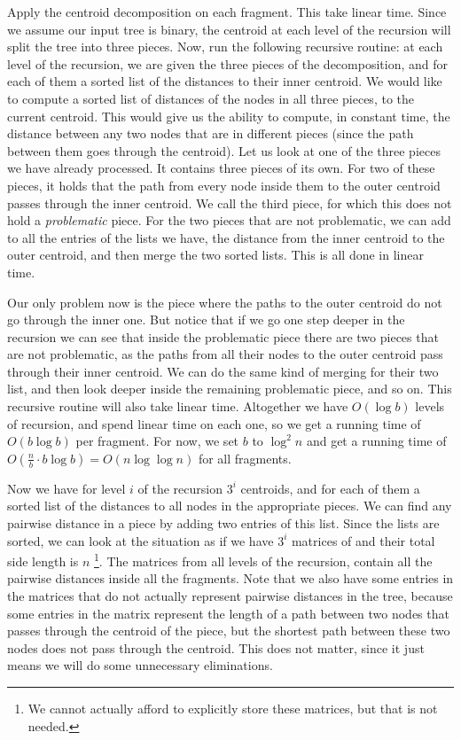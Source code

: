\documentclass[11pt,a4paper]{article}
\theoremstyle{definition}
\theoremstyle{remark}
\begin{document}
Apply the centroid decomposition on each fragment. This take linear time. Since we assume our input tree is binary, the centroid at each level of the recursion will split the tree into three pieces. Now, run the following recursive routine: at each level of the recursion, we are given the three pieces of the decomposition, and for each of them a sorted list of the distances to their inner centroid. We would like to compute a sorted list of distances of the nodes in all three pieces, to the current centroid. This would give us the ability to compute, in constant time, the distance between any two nodes that are in different pieces (since the path between them goes through the centroid). Let us look at one of the three pieces we have already processed. It contains three pieces of its own. For two of these pieces, it holds that the path from every node inside them to the outer centroid passes through the inner centroid. We call the third piece, for which this does not hold a \textit{problematic} piece. For the two pieces that are not problematic, we can add to all the entries of the lists we have, the distance from the inner centroid to the outer centroid, and then merge the two sorted lists. This is all done in linear time.

Our only problem now is the piece where the paths to the outer centroid do not go through the inner one. But notice that if we go one step deeper in the recursion we can see that inside the problematic piece there are two pieces that are not problematic, as the paths from all their nodes to the outer centroid pass through their inner centroid. We can do the same kind of merging for their two list, and then look deeper inside the remaining problematic piece, and so on. This recursive routine will also take linear time. Altogether we have $O(\log b)$ levels of recursion, and spend linear time on each one, so we get a running time of $O(b \log b)$ per fragment. For now, we set $b$ to $\log ^2 n$ and get a running time of $O(\frac{n}{b} \cdot b\log b) = O(n \log \log n)$ for all fragments.

Now we have for level $i$ of the recursion $3^i$ centroids, and for each of them a sorted list of the distances to all nodes in the appropriate pieces. We can find any pairwise distance in a piece by adding two entries of this list. Since the lists are sorted, we can look at the situation as if we have $3^i$ matrices of and their total side length is $n$ \footnote{We cannot actually afford to explicitly store these matrices, but that is not needed.}. The matrices from all levels of the recursion, contain all the pairwise distances inside all the fragments. Note that we also have some entries in the matrices that do not actually represent pairwise distances in the tree, because some entries in the matrix represent the length of a path between two nodes that passes through the centroid of the piece, but the shortest path between these two nodes does not pass through the centroid. This does not matter, since it just means we will do some unnecessary eliminations.
\end{document}
